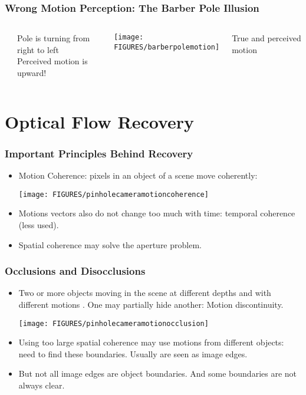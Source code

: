 \documentclass[10pt]{beamer}
\begin{document}
\begin{frame}
  \frametitle{Wrong Motion Perception: The Barber Pole Illusion}
  \begin{columns}
  \begin{center}
  \end{center}
  Pole is turning from right to left\\
  Perceived motion is upward!
  \begin{center}
    \texttt{[image: FIGURES/barberpolemotion]}
  \end{center}
  True and perceived motion
  \end{columns}
  
\end{frame}




\section{Optical Flow Recovery}
\label{sec:optrec}

\begin{frame}
  \frametitle{Important Principles Behind Recovery}
  \begin{itemize}
  \item Motion Coherence: pixels in an object of a scene move coherently:
    \begin{center}
      \texttt{[image: FIGURES/pinholecameramotioncoherence]}
    \end{center}
  \item Motions vectors also do not change too much with time:
    temporal coherence (less used).  
  \item Spatial coherence may solve the aperture problem.
  \end{itemize}
\end{frame}


\begin{frame}
  \frametitle{Occlusions and Disocclusions}
  \begin{itemize}
  \item Two or more objects moving in the scene at different depths
    and with  different motions . One may partially hide another:
    Motion discontinuity.
    \begin{center}
        \texttt{[image: FIGURES/pinholecameramotionocclusion]}
    \end{center}
  \item Using too large spatial coherence may use motions from
    different objects: need to find these boundaries. Usually
    are seen as image edges.
  \item But not all image edges are object boundaries. And some
    boundaries are not always clear.
  \end{itemize}
\end{frame}
\end{document}
